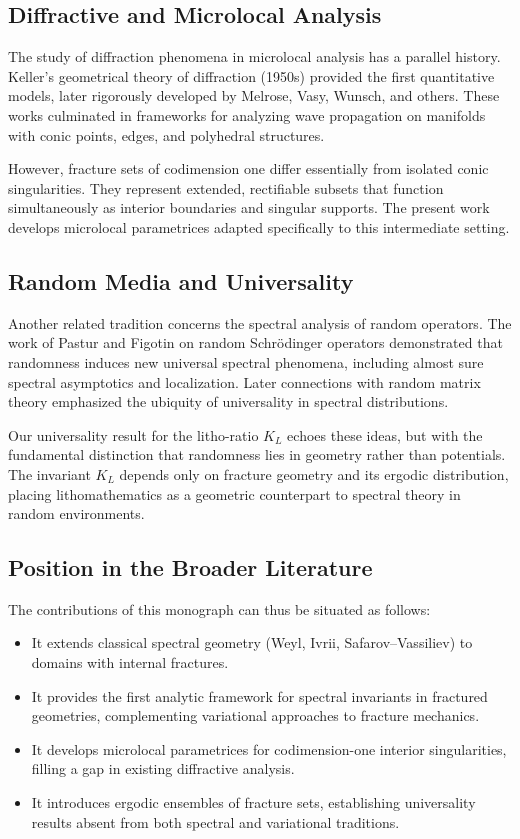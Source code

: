 \subsection{Diffractive and Microlocal Analysis}

The study of diffraction phenomena in microlocal analysis has a parallel 
history. Keller’s geometrical theory of diffraction (1950s) provided the first 
quantitative models, later rigorously developed by Melrose, Vasy, Wunsch, and 
others. These works culminated in frameworks for analyzing wave propagation on 
manifolds with conic points, edges, and polyhedral structures.

However, fracture sets of codimension one differ essentially from isolated 
conic singularities. They represent extended, rectifiable subsets that 
function simultaneously as interior boundaries and singular supports. The 
present work develops microlocal parametrices adapted specifically to this 
intermediate setting.

\subsection{Random Media and Universality}

Another related tradition concerns the spectral analysis of random operators. 
The work of Pastur and Figotin on random Schrödinger operators demonstrated 
that randomness induces new universal spectral phenomena, including almost sure 
spectral asymptotics and localization. Later connections with random matrix 
theory emphasized the ubiquity of universality in spectral distributions.

Our universality result for the litho-ratio $K_L$ echoes these ideas, but with 
the fundamental distinction that randomness lies in geometry rather than 
potentials. The invariant $K_L$ depends only on fracture geometry and its 
ergodic distribution, placing lithomathematics as a geometric counterpart to 
spectral theory in random environments.

\subsection{Position in the Broader Literature}

The contributions of this monograph can thus be situated as follows:
\begin{itemize}
  \item It extends classical spectral geometry (Weyl, Ivrii, Safarov–Vassiliev) 
  to domains with internal fractures.
  \item It provides the first analytic framework for spectral invariants in 
  fractured geometries, complementing variational approaches to fracture 
  mechanics.
  \item It develops microlocal parametrices for codimension-one interior 
  singularities, filling a gap in existing diffractive analysis.
  \item It introduces ergodic ensembles of fracture sets, establishing 
  universality results absent from both spectral and variational traditions.
\end{itemize}

